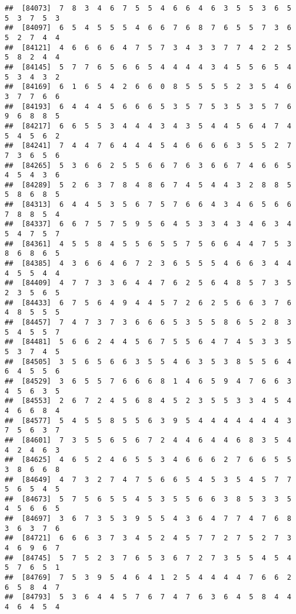 \documentclass[
]{book}
\begin{document}
\begin{verbatim}
##  [84073]  7  8  3  4  6  7  5  5  4  6  6  4  6  3  5  5  3  6  5  5  3  7  5  3
##  [84097]  6  5  4  5  5  5  4  6  6  7  6  8  7  6  5  5  7  3  6  5  2  7  4  4
##  [84121]  4  6  6  6  6  4  7  5  7  3  4  3  3  7  7  4  2  2  5  5  8  2  4  4
##  [84145]  5  7  7  6  5  6  6  5  4  4  4  4  3  4  5  5  6  5  4  5  3  4  3  2
##  [84169]  6  1  6  5  4  2  6  6  0  8  5  5  5  5  2  3  5  4  6  3  7  7  6  6
##  [84193]  6  4  4  4  5  6  6  6  5  3  5  7  5  3  5  3  5  7  6  9  6  8  8  5
##  [84217]  6  6  5  5  3  4  4  4  3  4  3  5  4  4  5  6  4  7  4  5  4  5  6  2
##  [84241]  7  4  4  7  6  4  4  4  5  4  6  6  6  6  3  5  5  2  7  7  3  6  5  6
##  [84265]  5  3  6  6  2  5  5  6  6  7  6  3  6  6  7  4  6  6  5  4  5  4  3  6
##  [84289]  5  2  6  3  7  8  4  8  6  7  4  5  4  4  3  2  8  8  5  5  8  6  8  5
##  [84313]  6  4  4  5  3  5  6  7  5  7  6  6  4  3  4  6  5  6  6  7  8  8  5  4
##  [84337]  6  6  7  5  7  5  9  5  6  4  5  3  3  4  3  4  6  3  4  5  4  7  5  7
##  [84361]  4  5  5  8  4  5  5  6  5  5  7  5  6  6  4  4  7  5  3  8  6  8  6  5
##  [84385]  4  3  6  6  4  6  7  2  3  6  5  5  5  4  6  6  3  4  4  4  5  5  4  4
##  [84409]  4  7  7  3  3  6  4  4  7  6  2  5  6  4  8  5  7  3  5  2  3  5  6  5
##  [84433]  6  7  5  6  4  9  4  4  5  7  2  6  2  5  6  6  3  7  6  4  8  5  5  5
##  [84457]  7  4  7  3  7  3  6  6  6  5  3  5  5  8  6  5  2  8  3  5  4  5  5  7
##  [84481]  5  6  6  2  4  4  5  6  7  5  5  6  4  7  4  5  3  3  5  5  3  7  4  5
##  [84505]  3  5  6  5  6  6  3  5  5  4  6  3  5  3  8  5  5  6  4  6  4  5  5  6
##  [84529]  3  6  5  5  7  6  6  6  8  1  4  6  5  9  4  7  6  6  3  4  5  6  3  5
##  [84553]  2  6  7  2  4  5  6  8  4  5  2  3  5  5  3  3  4  5  4  4  6  6  8  4
##  [84577]  5  4  5  5  8  5  5  6  3  9  5  4  4  4  4  4  4  4  3  7  5  6  3  7
##  [84601]  7  3  5  5  6  5  6  7  2  4  4  6  4  4  6  8  3  5  4  4  2  4  6  3
##  [84625]  4  6  5  2  4  6  5  5  3  4  6  6  6  2  7  6  6  5  5  3  8  6  6  8
##  [84649]  4  7  3  2  7  4  7  5  6  6  5  4  5  3  5  4  5  7  7  5  6  5  4  5
##  [84673]  5  7  5  6  5  5  4  5  3  5  5  6  6  3  8  5  3  3  5  4  5  6  6  5
##  [84697]  3  6  7  3  5  3  9  5  5  4  3  6  4  7  7  4  7  6  8  3  6  3  7  6
##  [84721]  6  6  6  3  7  3  4  5  2  4  5  7  7  2  7  5  2  7  3  4  6  9  6  7
##  [84745]  5  7  5  2  3  7  6  5  3  6  7  2  7  3  5  5  4  5  4  5  7  6  5  1
##  [84769]  7  5  3  9  5  4  6  4  1  2  5  4  4  4  4  7  6  6  2  6  5  8  4  7
##  [84793]  5  3  6  4  4  5  7  6  7  4  7  6  3  6  4  5  8  4  4  4  6  4  5  4

\end{verbatim}
\end{document}
